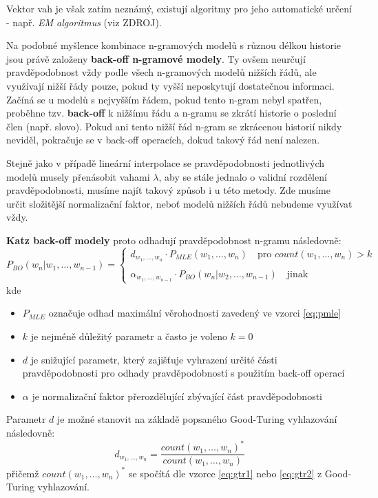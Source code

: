 \documentclass[12pt,a4paper]{report}
\begin{document}
Vektor vah je však zatím neznámý, existují algoritmy pro jeho automatické určení - např. \textit{EM algoritmus} (viz ZDROJ).

Na podobné myšlence kombinace n-gramových modelů s různou délkou historie jsou právě založeny \textbf{back-off n-gramové modely}. Ty ovšem neurčují pravděpodobnost vždy podle všech n-gramových modelů nižších řádů, ale využívají nižší řády pouze, pokud ty vyšší neposkytují dostatečnou informaci. Začíná se u modelů s nejvyšším řádem, pokud tento n-gram nebyl spatřen, proběhne tzv. \textbf{back-off} k nižšímu řádu a n-gramu se zkrátí historie o poslední člen (např. slovo). Pokud ani tento nižší řád n-gram se zkrácenou historií nikdy neviděl, pokračuje se v back-off operacích, dokud takový řád není nalezen.

Stejně jako v případě lineární interpolace se pravděpodobnosti jednotlivých modelů musely přenásobit vahami $\lambda$, aby se stále jednalo o validní rozdělení pravděpodobnosti, musíme najít takový způsob i u této metody. Zde musíme určit složitější normalizační faktor, neboť modelů nižších řádů nebudeme využívat vždy.

\textbf{Katz back-off modely} proto odhadují pravděpodobnost n-gramu následovně:
\begin{equation}
P_{BO}(w_n|w_1, \ldots, w_{n-1}) = \left\{
\begin{array}{l}
d_{w_1, \ldots, w_n} \cdot P_{MLE}(w_1, \ldots, w_n) \quad \text{pro $count(w_1, \ldots, w_n) > k$} \\
\\
\alpha_{w_1, \ldots, w_{n-1}} \cdot P_{BO}(w_n|w_2, \ldots, w_{n-1}) \quad \text{jinak} 
\end{array}\right.
\end{equation}
kde \begin{itemize}
\item{$P_{MLE}$ označuje odhad maximální věrohodnosti zavedený ve vzorci \eqref{eq:pmle}}
\item{$k$ je nejméně důležitý parametr a často je voleno $k = 0$}
\item{$d$ je snižující parametr, který zajišťuje vyhrazení určité části pravděpodobnosti pro odhady pravděpodobností s použitím back-off operací}
\item{$\alpha$ je normalizační faktor přerozdělující zbývající část pravděpodobnosti}
\end{itemize}

Parametr $d$ je možné stanovit na základě popsaného Good-Turing vyhlazování následovně:
\begin{equation}
d_{w_1, \ldots, w_n} = \frac{count(w_1, \ldots, w_n)^*}{count(w_1, \ldots, w_n)}
\end{equation}
přičemž $count(w_1, \ldots, w_n)^*$ se spočítá dle vzorce \eqref{eq:gtr1} nebo \eqref{eq:gtr2} z Good-Turing vyhlazování.
\end{document}
